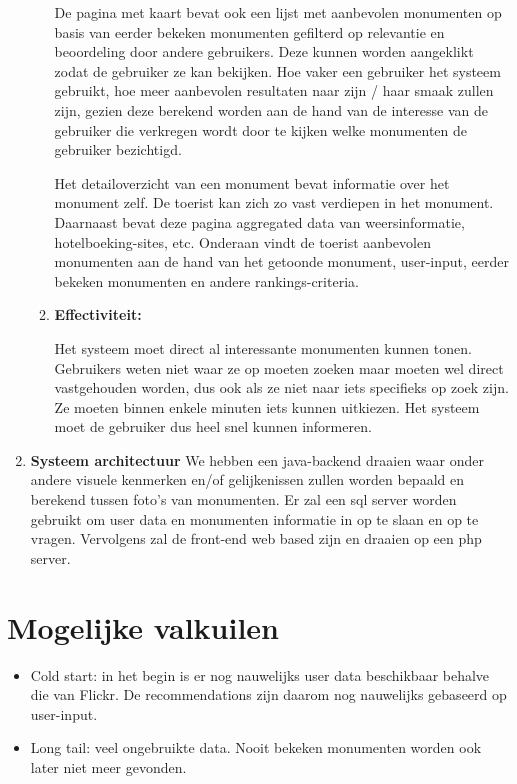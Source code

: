 \documentclass{article}
\begin{document}
\begin{enumerate}
\begin{enumerate}
		De pagina met kaart bevat ook een lijst met aanbevolen monumenten op basis van eerder bekeken monumenten gefilterd op relevantie en beoordeling door andere gebruikers. Deze kunnen worden aangeklikt zodat de gebruiker ze kan bekijken. Hoe vaker een gebruiker het systeem gebruikt, hoe meer aanbevolen resultaten naar zijn / haar smaak zullen zijn, gezien deze berekend worden aan de hand van de interesse van de gebruiker die verkregen wordt door te kijken welke monumenten de gebruiker bezichtigd.
		
		Het detailoverzicht van een monument bevat informatie over het monument zelf. De toerist kan zich zo vast verdiepen in het monument. Daarnaast bevat deze pagina aggregated data van weersinformatie, hotelboeking-sites, etc. Onderaan vindt de toerist aanbevolen monumenten aan de hand van het getoonde monument, user-input, eerder bekeken monumenten en andere rankings-criteria.
		
		\item{\textbf{Effectiviteit:}}
		
		Het systeem moet direct al interessante monumenten kunnen tonen. Gebruikers weten niet waar ze op moeten zoeken maar moeten wel direct vastgehouden worden, dus ook als ze niet naar iets specifieks op zoek zijn. Ze moeten binnen enkele minuten iets kunnen uitkiezen. Het systeem moet de gebruiker dus heel snel kunnen informeren.
	\end{enumerate}
	\item{\textbf{Systeem architectuur}}
	We hebben een java-backend draaien waar onder andere visuele kenmerken en/of gelijkenissen zullen worden bepaald en berekend tussen foto's van monumenten. Er zal een sql server worden gebruikt om user data en monumenten informatie in op te slaan en op te vragen. Vervolgens zal de front-end web based zijn en draaien op een php server.
	
\end{enumerate}

\section{Mogelijke valkuilen}
\begin{itemize}
	\item Cold start: in het begin is er nog nauwelijks user data beschikbaar behalve die van Flickr. De recommendations zijn daarom nog nauwelijks gebaseerd op user-input.
	\item Long tail: veel ongebruikte data. Nooit bekeken monumenten worden ook later niet meer gevonden.
\end{itemize}
\end{document}
